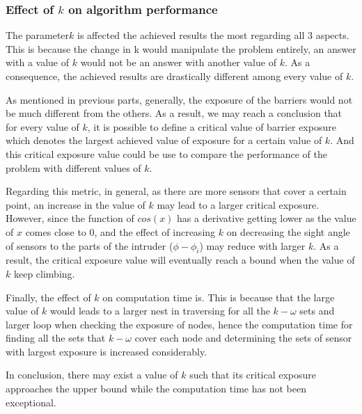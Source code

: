 \subsubsection{Effect of $k$ on algorithm performance}

The parameter$k$ is affected the achieved results the most regarding all 3 aspects. This is because the change in k would manipulate the problem entirely, an answer with a value of $k$ would not be an answer with another value of $k$. As a consequence, the achieved results are drastically different among every value of $k$.

As mentioned in previous parts, generally, the exposure of the barriers would not be much different from the others. As a result, we may reach a conclusion that for every value of $k$, it is possible to define a critical value of barrier exposure which denotes the largest achieved value of exposure for a certain value of $k$. And this critical exposure value could be use to compare the performance of the problem with different values of $k$.

Regarding this metric, in general, as there are more sensors that cover a certain point, an increase in the value of $k$ may lead to a larger critical exposure. However, since the function of $cos(x)$ has a derivative getting lower as the value of $x$ comes close to 0, and the effect of increasing $k$ on decreasing the sight angle of sensors to the parts of the intruder ($\phi - \phi_i$) may reduce with larger $k$. As a result, the critical exposure value will eventually reach a bound when the value of $k$ keep climbing.

Finally, the effect of $k$ on computation time is. This is because that the large value of $k$ would leads to a larger nest in traversing for all the $k-\omega$ sets and larger loop when checking the exposure of nodes, hence the computation time for finding all the sets that $k-\omega$ cover each node and determining the sets of sensor with largest exposure is increased considerably.

In conclusion, there may exist a value of $k$ such that its critical exposure approaches the upper bound while the computation time has not been exceptional.

